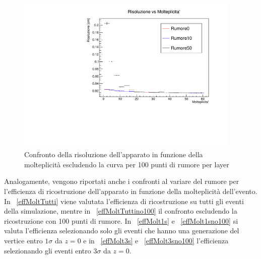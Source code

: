 \documentclass[11pt,a4paper]{article}
\begin{document}
\begin{figure}[h!]
{\begin{minipage}[r]{.48\textwidth}
     \includegraphics[width=0.95\textwidth]{Immagini/risoluzione_0_no_rumore100.pdf}
  \vspace{-5pt}
     \caption{Confronto della risoluzione dell'apparato in funzione della molteplicità escludendo la curva per 100 punti di rumore per layer}
  \label{RumoreRismoltno100}
   \end{minipage}}
  \vspace{-20pt}
\end{figure}

\newpage
\par Analogamente, vengono riportati anche i confronti al variare del rumore per l'efficienza di ricostruzione dell'apparato in funzione della molteplicità dell'evento. In \figurename~\ref{effMoltTutti} viene valutata l'efficienza di ricostruzione su tutti gli eventi della simulazione, mentre in \figurename~\ref{effMoltTuttino100} il confronto escludendo la ricostruzione con 100 punti di rumore. In \figurename~\ref{effMolt1s} e \figurename~\ref{effMolt1sno100} si valuta l'efficienza selezionando solo gli eventi che hanno una generazione del vertice entro $1\sigma$ da $z=0$ e in \figurename~\ref{effMolt3s} e \figurename~\ref{effMolt3sno100} l'efficienza selezionando gli eventi entro $3\sigma$ da $z=0$.
\end{document}
